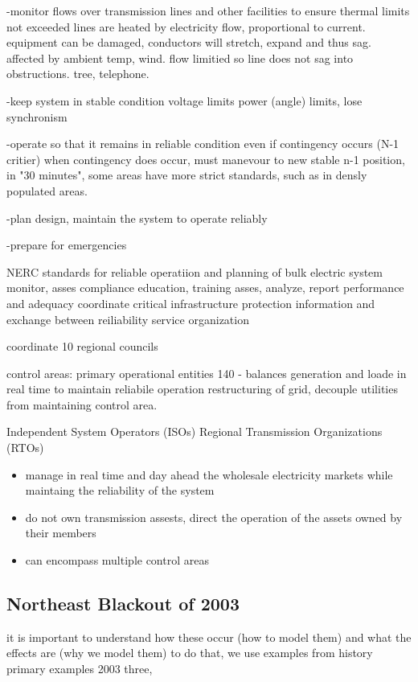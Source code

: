 -monitor flows over transmission lines and other facilities to ensure thermal limits not exceeded
lines are heated by electricity flow, proportional to current. equipment can be damaged, conductors will stretch, expand and thus sag.  affected by ambient temp, wind.  flow limitied so line does not sag into obstructions. tree, telephone.

-keep system in stable condition
voltage limits
power (angle) limits, lose synchronism

-operate so that it remains in reliable condition even if contingency occurs (N-1 critier)
when contingency does occur, must manevour to new stable n-1 position, in "30 minutes", some areas have more strict standards, such as in densly populated areas.

-plan design, maintain the system to operate reliably

-prepare for emergencies


NERC
standards for reliable operatiion and planning of bulk electric system
monitor, asses compliance
education, training
asses, analyze, report performance and adequacy
coordinate critical infrastructure protection
information and exchange between reiliability service organization

coordinate 10 regional councils

control areas: primary operational entities
140 - balances generation and loade in real time to maintain reliabile operation
restructuring of grid, decouple utilities from maintaining control area.

Independent System Operators (ISOs)
Regional Transmission Organizations (RTOs)

\begin{itemize}
\item manage in real time and day ahead the wholesale electricity markets while maintaing the reliability of the system 
\item do not own transmission assests, direct the operation of the assets owned by their members
\item can encompass multiple control areas
\end{itemize}

\subsection{Northeast Blackout of 2003}

it is important to understand how these occur (how to model them) and what the effects are (why we model them)
to do that, we use examples from history
primary examples 2003 three,

